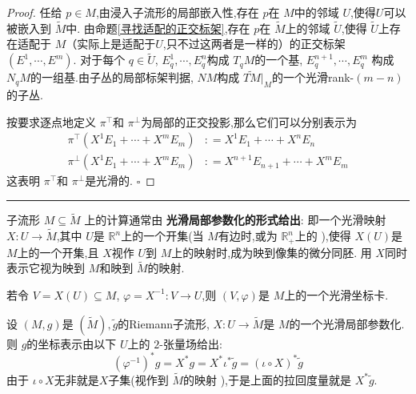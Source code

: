 \documentclass[../../几何与拓扑.tex]{subfiles}
\begin{document}
\begin{proof}
    任给 \(  p \in M  \),由浸入子流形的局部嵌入性,存在 \(  p  \)在 \(  M  \)中的邻域 \(  U  \),使得\(  U  \)可以被嵌入到 \(  \tilde{M} \)中.       
    由命题\ref{寻找适配的正交标架},存在 \(  p  \)在 \(  \tilde{M}  \)上的邻域   \(  \tilde{U}  \),使得 \(  \tilde{U}  \)上存在适配于 \(  M  \)（实际上是适配于\(  U  \),只不过这两者是一样的）的正交标架 \(  \left(  E^1,\cdots,E^m  \right)   \).
        对于每个 \(  q \in \tilde{U}  \), \(  E_{q}^{1},\cdots ,E_{q}^{n}  \)构成 \(  T_{q}M  \)的一个基, \(  E_{q}^{n+ 1},\cdots ,E_{q}^{m}  \)    构成 \(  N_{q}M  \)的一组基.由子丛的局部标架判据, \(  NM  \)构成 \(  \tilde{TM}|_{M}  \)的一个光滑rank-\(  \left( m-n \right)   \)的子丛.
        
        按要求逐点地定义 \(  \pi ^{\top}  \)和 \(  \pi ^{\perp}  \)为局部的正交投影,那么它们可以分别表示为  \[
       \begin{aligned}
        \pi ^{\top}\left(  X^{1}E_1+ \cdots + X^{m}E_{m} \right)&: =  X^{1}E_1+ \cdots + X^{n}E_{n}\\ 
         \pi ^{\perp}\left( X^{1}E_1+ \cdots+  X^{m}E_{m} \right)&: =  X^{n+ 1}E_{n+ 1}+ \cdots + X^{m}E_{m} 
       \end{aligned}  
        \]这表明 \(  \pi ^{\top}  \)和 \(  \pi ^{\perp}  \)是光滑的.  
    \hfill $\square$
\end{proof}


\hspace*{\fill} 
\hrule
\hspace*{\fill}


子流形 \(  M\subseteq \tilde{M}  \) 上的计算通常由 \textbf{光滑局部参数化的形式给出}: 即一个光滑映射 \(  X: U\to \tilde{M}  \),其中 \(  U  \)是 \(  \mathbb{R} ^{n}  \)上的一个开集(当 \(  M  \)有边时,或为 \(  \mathbb{R} ^{n}_{+ }  \)上的  ),使得 \(  X\left( U \right)   \)是 \(  M  \)上的一个开集,且 \(  X  \)视作 \(  U  \)到 \(  M  \)上的映射时,成为映到像集的微分同胚.  用 \(  X  \)同时表示它视为映到 \(  M  \)和映到 \(  \tilde{M}  \)的映射. 

若令 \(  V= X\left( U \right)\subseteq M   \), \(   \varphi = X ^{-1} :V\to U  \),则 \(  \left( V, \varphi  \right)   \)是 \(  M  \)上的一个光滑坐标卡.

设 \(  \left( M,g \right)   \)是 \(  \left( \tilde{M} \right),\tilde{g}   \)的Riemann子流形, \(  X:U\to \tilde{M}  \)是 \(  M  \)的一个光滑局部参数化.则 \(  g  \)的坐标表示由以下 \(  U  \)上的 \(  2  \)-张量场给出: \[
\left(  \varphi ^{-1}  \right)^{*}g =  X^{*}g =  X^{*}\iota ^{*}\tilde{g}= \left( \iota \circ X \right)^{*} \tilde{g}  
\]       由于 \(  \iota \circ X  \)无非就是\(  X  \)子集(视作到 \(  \tilde{M}  \)的映射 ),于是上面的拉回度量就是 \(  X^{*}\tilde{g}  \).
\end{document}
